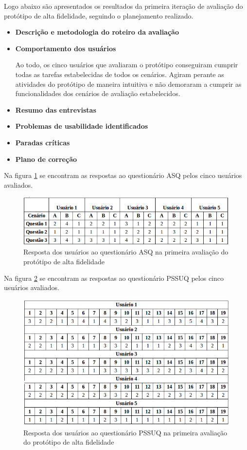       Logo abaixo são apresentados os resultados da primeira iteração de avaliação do protótipo de alta fidelidade,
      seguindo o planejamento realizado.
      
      \begin{itemize}
       \item \textbf{Descrição e metodologia do roteiro da avaliação}
       
       \item \textbf{Comportamento dos usuários}
       
       Ao todo, os cinco usuários que avaliaram o protótipo conseguiram cumprir todas as tarefas estabelecidas 
       de todos os cenários. Agiram perante as atividades do protótipo de maneira intuitiva e não demoraram a 
       cumprir as funcionalidades dos cenários de avaliação estabelecidos.
       
       \item \textbf{Resumo das entrevistas}
       
       \item \textbf{Problemas de usabilidade identificados}
       
       \item \textbf{Paradas críticas}
       
       \item \textbf{Plano de correção}
      \end{itemize}
      
      Na figura \ref{asqalta} se encontram as respostas ao questionário ASQ pelos cinco usuários avaliados.
      
      \begin{figure}[!htb]
      \centering
      \includegraphics[scale=0.6]{figuras/asqalta.jpg}
      \caption{Resposta dos usuários ao questionário ASQ na primeira avaliação do protótipo de alta fidelidade}
      \label{asqalta}
      \end{figure}
      
      Na figura \ref{pssuqalta} se encontram as respostas ao questionário PSSUQ pelos cinco usuários avaliados.
      
      \begin{figure}[!htb]
      \centering
      \includegraphics[scale=0.6]{figuras/pssuqalta.jpg}
      \caption{Resposta dos usuários ao questionário PSSUQ na primeira avaliação do protótipo de alta fidelidade}
      \label{pssuqalta}
      \end{figure}